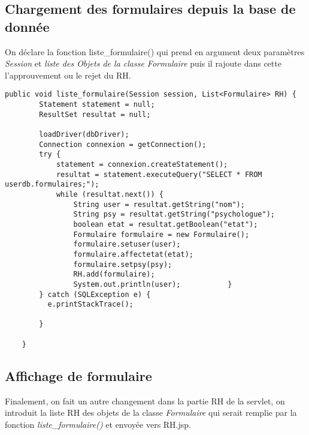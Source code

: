\documentclass[12]{article}
\begin{document}
\subsection{Chargement des formulaires depuis la base de donnée}

On déclare la fonction liste\_formulaire() qui prend en argument deux paramètres \textit{Session} et \textit{liste des Objets de la classe Formulaire} puis il rajoute dans cette l'approuvement ou le rejet du RH.

\lstset{language=java}
\begin{lstlisting}
public void liste_formulaire(Session session, List<Formulaire> RH) {
        Statement statement = null;
        ResultSet resultat = null;

        loadDriver(dbDriver);
        Connection connexion = getConnection();
        try {
            statement = connexion.createStatement();
            resultat = statement.executeQuery("SELECT * FROM userdb.formulaires;");
            while (resultat.next()) {
                String user = resultat.getString("nom");
                String psy = resultat.getString("psychologue");
                boolean etat = resultat.getBoolean("etat");
                Formulaire formulaire = new Formulaire();
                formulaire.setuser(user);
                formulaire.affectetat(etat);
                formulaire.setpsy(psy);
                RH.add(formulaire);
                System.out.println(user);           }
        } catch (SQLException e) {
          e.printStackTrace();
            
        }
       
    }
\end{lstlisting}

\subsection{Affichage de formulaire}

Finalement, on fait un autre changement dans la partie RH de la servlet, on introduit la liste RH des objets de la classe \textit{Formulaire} qui serait remplie par la fonction \textit{liste\_formulaire()} et envoyée vers RH.jsp.
\end{document}
